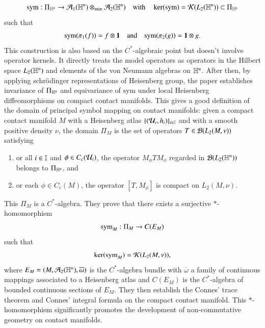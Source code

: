 \documentclass[leqno]{amsart}
\begin{document}
	\begin{align*}
		{\rm sym}:\Pi_{\mathbb{H}^{n}}\rightarrow {\mathcal A}_{1}(\mathbb{H}^{n})\otimes_{\rm min}{\mathcal A}_{2}(\mathbb{H}^{n})
		\quad\mbox{with}\quad \ker({\rm sym})={\mathcal K}(L_{2}(\mathbb{H}^{n}))\subset\Pi_{\mathbb{H}^{n}}
	\end{align*}
	such that 
	\begin{align*}
		{\rm sym}(\pi_{1}(f))=f\otimes\mathbf 1 \quad\mbox{and}\quad 
		{\rm sym}(\pi_{2}(g))=\mathbf 1\otimes g.
	\end{align*} 
	This construction is also based on the $C^{*}$-algebraic point but doesn’t involve operator kernels. It directly treats the model operators as operators in the Hilbert space $L_{2}(\mathbb{H}^{n})$ and elements of
	the von Neumann algebras on $\mathbb{H}^{n}$. 
	After then, by applying schr\"{o}dinger representations of Heisenberg group, the paper \cite{DAO4} establishes invariance of $\Pi_{\mathbb{H}^{n}}$ and equivariance of $\mathrm{sym}$ under local Heisenberg diffeomorphisms \cite[definition 1.3.5]{DAO4} on compact contact manifolds. 
	This gives a good definition of the domain of principal symbol mapping on contact manifolds:
	given a compact contact manifold $M$ with a Heisenberg atlas $\{({\mathcal U}_{i},h_{i})\}_{i\in\mathbb I}$ and with a smooth positive density $\nu$, the domain $\Pi_{M}$ is the set of operators $T\in{\mathcal B}(L_{2}(M,\nu))$ satisfying
	\begin{enumerate}[\rm(i)]
		\item {}or all $i\in\mathbb I$ and $\phi\in C_{c}({\mathcal U}_{i})$, the operator $M_{\phi}TM_{\phi}$ regarded in ${\mathcal B}(L_{2}(\mathbb{H}^{n}))$ belongs to $\Pi_{\mathbb{H}^{n}}$, and
		\item {}or each $\phi\in C_{c}(M)$, the operator $[T,M_{\phi}]$ is compact on $L_{2}(M,\nu)$.
	\end{enumerate}
	This $\Pi_{M}$ is a $C^{*}$-algebra. They prove that
	there exists a surjective $*$-homomorphism $${\rm sym}_{M}:\Pi_{M}\to C(E_{M})$$ such that $$\ker({\rm sym}_{M})={\mathcal K}(L_{2}(M,\nu)),$$
	where $E_{M}=(M,{\mathcal A}_{2}(\mathbb{H}^{n}),\overline{\omega})$ is the $C^{*}$-algebra bundle with $\overline{\omega}$ a family of continuous mappings associated to a Heisenberg atlas \cite[definition 1.3.6]{DAO4} and $C(E_{M})$ is the $C^{*}$-algebra of bounded continuous sections of $E_{M}$. They then establish the Connes' trace theorem and Connes' integral formula on the compact contact manifold. This $*$-homomorphism significantly promotes the development of non-commutative geometry on contact manifolds.
	
\end{document}
